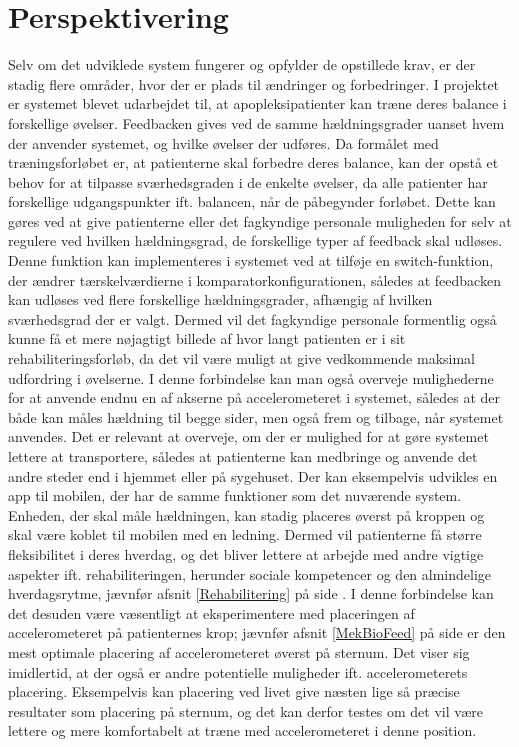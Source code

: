 \section{Perspektivering}
Selv om det udviklede system fungerer og opfylder de opstillede krav, er der stadig flere områder, hvor der er plads til ændringer og forbedringer. 
I projektet er systemet blevet udarbejdet til, at apopleksipatienter kan træne deres balance i forskellige øvelser. Feedbacken gives ved de samme hældningsgrader uanset hvem der anvender systemet, og hvilke øvelser der udføres. Da formålet med træningsforløbet er, at patienterne skal forbedre deres balance, kan der opstå et behov for at tilpasse sværhedsgraden i de enkelte øvelser, da alle patienter har forskellige udgangspunkter ift. balancen, når de påbegynder forløbet. Dette kan gøres ved at give patienterne eller det fagkyndige personale muligheden for selv at regulere ved hvilken hældningsgrad, de forskellige typer af feedback skal udløses. Denne funktion kan implementeres i systemet ved at tilføje en switch-funktion, der ændrer tærskelværdierne i komparatorkonfigurationen, således at feedbacken kan udløses ved flere forskellige hældningsgrader, afhængig af hvilken sværhedsgrad der er valgt. Dermed vil det fagkyndige personale formentlig også kunne få et mere nøjagtigt billede af hvor langt patienten er i sit rehabiliteringsforløb, da det vil være muligt at give vedkommende maksimal udfordring i øvelserne. I denne forbindelse kan man også overveje mulighederne for at anvende endnu en af akserne på accelerometeret i systemet, således at der både kan måles hældning til begge sider, men også frem og tilbage, når systemet anvendes.
Det er relevant at overveje, om der er mulighed for at gøre systemet lettere at transportere, således at patienterne kan medbringe og anvende det andre steder end i hjemmet eller på sygehuset. Der kan eksempelvis udvikles en app til mobilen, der har de samme funktioner som det nuværende system. Enheden, der skal måle hældningen, kan stadig placeres øverst på kroppen og skal være koblet til mobilen med en ledning. Dermed vil patienterne få større fleksibilitet i deres hverdag, og det bliver lettere at arbejde med andre vigtige aspekter ift. rehabiliteringen, herunder sociale kompetencer og den almindelige hverdagsrytme, jævnfør afsnit \ref{Rehabilitering} på side \pageref{Rehabilitering}. I denne forbindelse kan det desuden være væsentligt at eksperimentere med placeringen af accelerometeret på patienternes krop; jævnfør afsnit \ref{MekBioFeed} på side \pageref{MekBioFeed} er den mest optimale placering af accelerometeret øverst på sternum. Det viser sig imidlertid, at der også er andre potentielle muligheder ift. accelerometerets placering. Eksempelvis kan placering ved livet give næsten lige så præcise resultater som placering på sternum, og det kan derfor testes om det vil være lettere og mere komfortabelt at træne med accelerometeret i denne position\cite{Gjoreski2011}.\\ 
